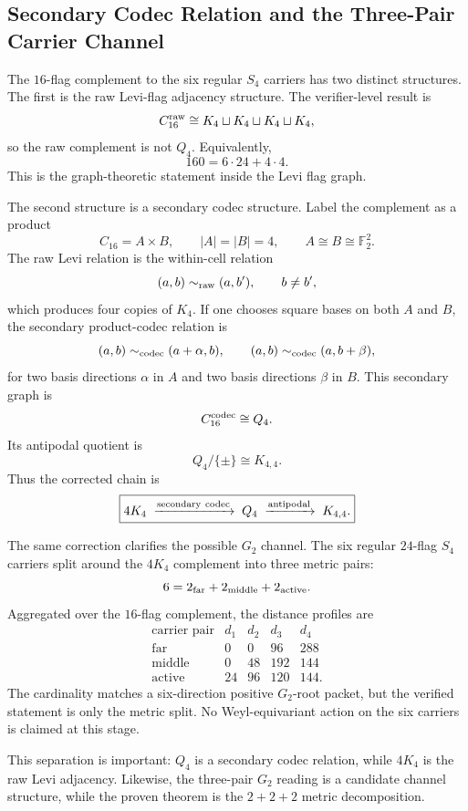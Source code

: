 \subsection{Secondary Codec Relation and the Three-Pair Carrier Channel}

The \(16\)-flag complement to the six regular \(S_4\) carriers has two distinct structures.  The first is the raw Levi-flag adjacency structure.  The verifier-level result is
\[
C_{16}^{\rm raw}\cong K_4\sqcup K_4\sqcup K_4\sqcup K_4,
\]
so the raw complement is not \(Q_4\).  Equivalently,
\[
160=6\cdot24+4\cdot4.
\]
This is the graph-theoretic statement inside the Levi flag graph.

The second structure is a secondary codec structure.  Label the complement as a product
\[
C_{16}=A\times B,
\qquad |A|=|B|=4,
\qquad A\cong B\cong\mathbb F_2^2.
\]
The raw Levi relation is the within-cell relation
\[
(a,b)\sim_{\rm raw}(a,b'),\qquad b\ne b',
\]
which produces four copies of \(K_4\).  If one chooses square bases on both \(A\) and \(B\), the secondary product-codec relation is
\[
(a,b)\sim_{\rm codec}(a+\alpha,b),\qquad
(a,b)\sim_{\rm codec}(a,b+\beta),
\]
for two basis directions \(\alpha\) in \(A\) and two basis directions \(\beta\) in \(B\).  This secondary graph is
\[
C_{16}^{\rm codec}\cong Q_4.
\]
Its antipodal quotient is
\[
Q_4/\{\pm\}\cong K_{4,4}.
\]
Thus the corrected chain is
\[
\boxed{4K_4\;\xrightarrow{\rm secondary\ codec}\;Q_4\;\xrightarrow{\rm antipodal}\;K_{4,4}.}
\]

The same correction clarifies the possible \(G_2\) channel.  The six regular \(24\)-flag \(S_4\) carriers split around the \(4K_4\) complement into three metric pairs:
\[
6=2_{\rm far}+2_{\rm middle}+2_{\rm active}.
\]
Aggregated over the \(16\)-flag complement, the distance profiles are
\[
\begin{array}{c|cccc}
\text{carrier pair} & d_1 & d_2 & d_3 & d_4\\
\hline
\text{far} & 0 & 0 & 96 & 288\\
\text{middle} & 0 & 48 & 192 & 144\\
\text{active} & 24 & 96 & 120 & 144.
\end{array}
\]
The cardinality matches a six-direction positive \(G_2\)-root packet, but the verified statement is only the metric split.  No Weyl-equivariant action on the six carriers is claimed at this stage.

This separation is important: \(Q_4\) is a secondary codec relation, while \(4K_4\) is the raw Levi adjacency.  Likewise, the three-pair \(G_2\) reading is a candidate channel structure, while the proven theorem is the \(2+2+2\) metric decomposition.
